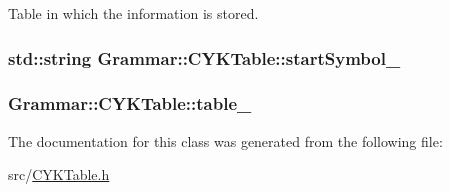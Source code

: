\-Table in which the information is stored. 

\hypertarget{classGrammar_1_1CYKTable_a058a0ca85dc07b1d0e590d90ef728ef2}{
\subsubsection[{start\-Symbol\-\_\-}]{\setlength{\rightskip}{0pt plus 5cm}std\-::string {\bf \-Grammar\-::\-C\-Y\-K\-Table\-::start\-Symbol\-\_\-}}}\label{dc/d7d/classGrammar_1_1CYKTable_a058a0ca85dc07b1d0e590d90ef728ef2}
\hypertarget{classGrammar_1_1CYKTable_a79b636642dc8abac802e95664bd3deaa}{
\subsubsection[{table\-\_\-}]{ {\bf \-Grammar\-::\-C\-Y\-K\-Table\-::table\-\_\-}}}\label{dc/d7d/classGrammar_1_1CYKTable_a79b636642dc8abac802e95664bd3deaa}


\-The documentation for this class was generated from the following file\-:\begin{DoxyCompactItemize}
\item 
src/\hyperlink{CYKTable_8h}{\-C\-Y\-K\-Table.\-h}\end{DoxyCompactItemize}
